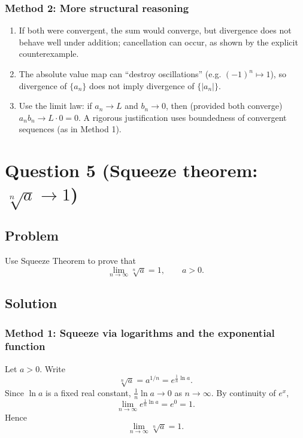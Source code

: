 \documentclass[12pt]{article}
\begin{document}
\subsubsection*{Method 2: More structural reasoning}

\begin{enumerate}[label=(\alph*)]
\item If both were convergent, the sum would converge, but divergence does not behave well under addition; cancellation can occur, as shown by the explicit counterexample.

\item The absolute value map can ``destroy oscillations'' (e.g. \((-1)^n\mapsto 1\)), so divergence of \(\{a_n\}\) does not imply divergence of \(\{|a_n|\}\).

\item Use the limit law: if \(a_n\to L\) and \(b_n\to 0\), then (provided both converge) \(a_nb_n\to L\cdot 0=0\). A rigorous justification uses boundedness of convergent sequences (as in Method 1).
\end{enumerate}

\newpage


\section*{Question 5 (Squeeze theorem: \(\sqrt[n]{a}\to 1\))}

\subsection*{Problem}
Use Squeeze Theorem to prove that
\[
\lim_{n\to\infty}\sqrt[n]{a}=1,\qquad a>0.
\]

\subsection*{Solution}

\subsubsection*{Method 1: Squeeze via logarithms and the exponential function}

Let \(a>0\). Write
\[
\sqrt[n]{a}=a^{1/n}=e^{\frac{1}{n}\ln a}.
\]
Since \(\ln a\) is a fixed real constant, \(\frac{1}{n}\ln a\to 0\) as \(n\to\infty\). By continuity of \(e^{x}\),
\[
\lim_{n\to\infty} e^{\frac{1}{n}\ln a}=e^{0}=1.
\]
Hence
\[
\boxed{\lim_{n\to\infty}\sqrt[n]{a}=1.}
\]
\end{document}
